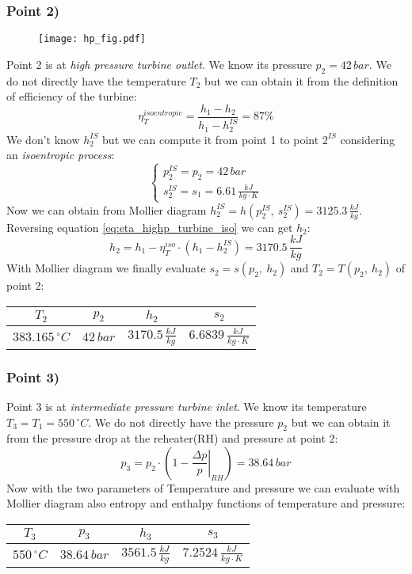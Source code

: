 \documentclass[a4paper,12pt]{article}
\newcommand{\celsius}[0]{\,^{\circ}C}
\newcommand{\kjkg}[0]{\,\frac{kJ}{kg}}
\newcommand{\kjkgk}[0]{\,\frac{kJ}{kg \cdot K}}
\newcommand{\md}[0]{Mollier diagram }
\newcommand{\pointdatatable}[5]{
\begin{center}
\tabulinesep=1.2mm
\begin{tabu}{|c|c|c|c|}
\hline
$ T_{#1} $ & $ p_{#1} $ & $ h_{#1} $ & $ s_{#1} $\\ \hline
$ #2 \celsius $ & $ #3 \,bar $ & $ #4 \kjkg $ & $ #5 \kjkgk $\\ \hline
\end{tabu}
\end{center}
}
\begin{document}
\subsubsection*{Point 2)}
\begin{wrapfigure}{L}{2cm}
    \texttt{[image: hp\_fig.pdf]}
\end{wrapfigure}
Point 2 is at \emph{high pressure turbine outlet}. We know its pressure $p_2=42\,bar$. We do not directly have the temperature $T_2$ but we can obtain it from the definition of efficiency of the turbine:
\begin{equation}
\label{eq:eta_highp_turbine_iso}
\eta_T^{isoentropic} = \frac{h_1-h_2}{h_1-h_2^{IS}} = 87\%
\end{equation}
We don't know $h_2^{IS}$ but we can compute it from point 1 to point $2^{IS}$ considering an \emph{isoentropic process}:
\[\begin{cases}{}
p_2^{IS} = p_2 = 42 \,bar \\ 
s_2^{IS} = s_1 = 6.61 \kjkgk
\end{cases}\]
Now we can obtain from \md $h_2^{IS} = h(p_2^{IS},\ s_2^{IS}) = 3125.3 \kjkg$.
\\Reversing equation \ref{eq:eta_highp_turbine_iso} we can get $h_2$:
\begin{equation}
h_2=h_1-\eta_T^{iso} \cdot \left(h_1 - h_2^{IS} \right) = 3170.5 \kjkg
\end{equation}
With \md we finally evaluate $s_2 = s(p_2,\ h_2)$ and $T_2 = T(p_2,\ h_2)$ of point 2:
\pointdatatable{2}{383.165}{42}{3170.5}{6.6839}
%
%
%
\subsubsection*{Point 3)}
Point 3 is at \emph{intermediate pressure turbine inlet}. We know its temperature $T_3 = T_1 = 550 \celsius$. We do not directly have the pressure $p_2$ but we can obtain it from the pressure drop at the reheater(RH) and pressure at point 2:
\begin{equation}
p_3 = p_{2} \cdot \left( 1- \left. \frac{\Delta p}{p} \right\rvert_{RH} \right) = 38.64\,bar
\end{equation}
Now with the two parameters of Temperature and pressure we can evaluate with \md also entropy and enthalpy functions of temperature and pressure:
\pointdatatable{3}{550}{38.64}{3561.5}{7.2524}
%
%
%
\end{document}
